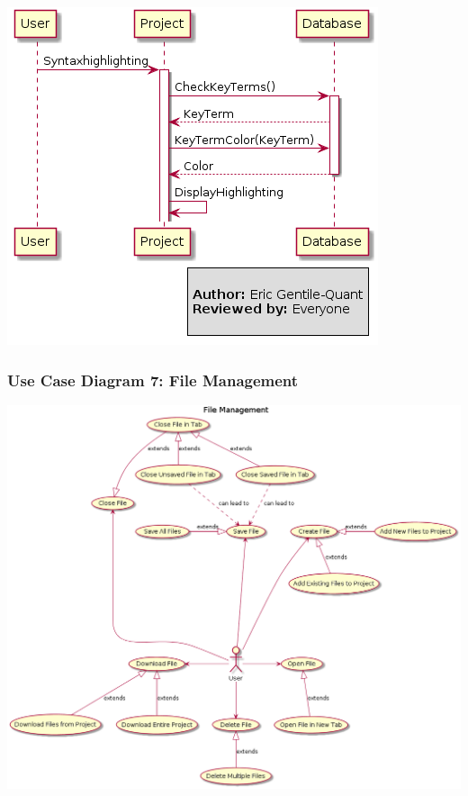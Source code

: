 \documentclass[twoside,letterpaper]{article}
\begin{document}
\bigskip

\includegraphics[width=\textwidth]{images/SequenceDiagrams/SyntaxHighlighting}

\newpage


\subsubsection[Use Case Diagram 7: File Management]{\rmfamily\bfseries\color{black}
	Use Case Diagram 7: File Management}
\hypertarget{RefHeading22059017292}{}

\includegraphics[width=\textwidth]{images/UseCaseDiagrams/FileManagement}
\end{document}
